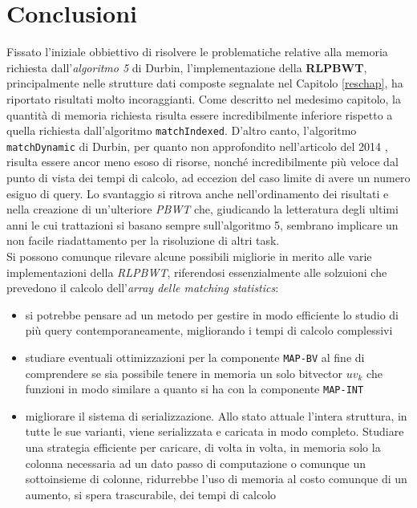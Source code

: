 \documentclass[a4paper,12pt, oneside, draft]{book}
\begin{document}
%


\chapter{Conclusioni}
\label{conchap}
Fissato l'iniziale obbiettivo di risolvere le problematiche relative alla
memoria richiesta dall'\textit{algoritmo 5} di Durbin, l'implementazione della
\textbf{RLPBWT}, principalmente nelle strutture dati composte segnalate nel
Capitolo \ref{reschap}, ha riportato risultati molto incoraggianti. Come
descritto nel medesimo capitolo, la quantità di memoria richiesta risulta essere 
incredibilmente inferiore rispetto a quella richiesta dall'algoritmo
\texttt{matchIndexed}. D'altro canto, l'algoritmo \texttt{matchDynamic} di 
Durbin, per quanto non approfondito nell'articolo del 2014 \cite{pbwt}, risulta
essere ancor meno esoso di risorse, nonché incredibilmente più veloce dal punto
di vista dei tempi di calcolo, ad eccezion del caso limite di avere un numero
esiguo di query. Lo svantaggio si ritrova anche nell'ordinamento dei risultati
e nella creazione di un'ulteriore \textit{PBWT}
che, giudicando la letteratura degli ultimi anni le cui trattazioni si basano
sempre sull'algoritmo 5, sembrano implicare un non facile 
riadattamento per la risoluzione di altri task.\\
Si possono comunque rilevare alcune possibili migliorie in merito
alle varie implementazioni della \textit{RLPBWT}, riferendosi essenzialmente
alle solzuioni che prevedono il calcolo dell'\textit{array delle matching
  statistics}: 
\begin{itemize}
  \item si potrebbe pensare ad un metodo per gestire in modo efficiente lo
  studio di più query contemporaneamente, migliorando i tempi di calcolo
  complessivi
  \item studiare eventuali ottimizzazioni per la componente \texttt{MAP-BV} al
  fine di comprendere se sia possibile tenere in
  memoria un solo bitvector $uv_k$ che funzioni in modo similare a quanto si ha
  con la componente \texttt{MAP-INT}
  \item migliorare il sistema di serializzazione. Allo stato attuale l'intera
  struttura, in tutte le sue varianti, viene serializzata e caricata in modo
  completo. Studiare una 
  strategia efficiente per caricare, di volta in volta, in memoria solo la
  colonna necessaria ad un dato passo di computazione o comunque un sottoinsieme
  di colonne, ridurrebbe l'uso di memoria al costo comunque di un aumento, si
  spera trascurabile, dei tempi di calcolo
\end{itemize}
\end{document}
